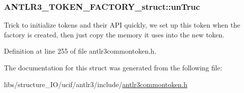 \hypertarget{struct_a_n_t_l_r3___t_o_k_e_n___f_a_c_t_o_r_y__struct_a8047d14d770f3d37823460a61d2263b8}{
\subsubsection[{un\-Truc}]{ A\-N\-T\-L\-R3\-\_\-\-T\-O\-K\-E\-N\-\_\-\-F\-A\-C\-T\-O\-R\-Y\-\_\-struct\-::un\-Truc}}\label{struct_a_n_t_l_r3___t_o_k_e_n___f_a_c_t_o_r_y__struct_a8047d14d770f3d37823460a61d2263b8}
Trick to initialize tokens and their A\-P\-I quickly, we set up this token when the factory is created, then just copy the memory it uses into the new token. 

Definition at line 255 of file antlr3commontoken.\-h.



The documentation for this struct was generated from the following file\-:\begin{DoxyCompactItemize}
\item 
libs/structure\-\_\-\-I\-O/ucif/antlr3/include/\hyperlink{antlr3commontoken_8h}{antlr3commontoken.\-h}\end{DoxyCompactItemize}
